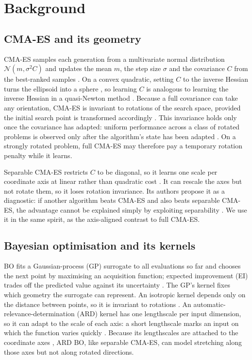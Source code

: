 \documentclass[12pt]{article}
\begin{document}
\section{Background}
\label{sec:background}
\subsection{CMA-ES and its geometry}
CMA-ES samples each generation from a multivariate normal distribution $\mathcal N(m,\sigma^2 C)$ and updates the mean $m$, the step size $\sigma$ and the covariance $C$ from the best-ranked samples \parencite[p.~8]{hansen2023tutorial}. On a convex quadratic, setting $C$ to the inverse Hessian turns the ellipsoid into a sphere \parencite[p.~7]{hansen2023tutorial}, so learning $C$ is analogous to learning the inverse Hessian in a quasi-Newton method \parencite[p.~22]{hansen2023tutorial}. Because a full covariance can take any orientation, CMA-ES is invariant to rotations of the search space, provided the initial search point is transformed accordingly \parencite[p.~24]{hansen2023tutorial}. This invariance holds only once the covariance has adapted: uniform performance across a class of rotated problems is observed only after the algorithm's state has been adapted \parencite[p.~24]{hansen2023tutorial}. On a strongly rotated problem, full CMA-ES may therefore pay a temporary rotation penalty while it learns.

Separable CMA-ES restricts $C$ to be diagonal, so it learns one scale per coordinate axis at linear rather than quadratic cost \parencite{ros2008simple}. It can rescale the axes but not rotate them, so it loses rotation invariance. Its authors propose it as a diagnostic: if another algorithm beats CMA-ES and also beats separable CMA-ES, the advantage cannot be explained simply by exploiting separability \parencite{ros2008simple}. We use it in the same spirit, as the axis-aligned contrast to full CMA-ES.

\subsection{Bayesian optimisation and its kernels}
BO fits a Gaussian-process (GP) surrogate to all evaluations so far and chooses the next point by maximising an acquisition function; expected improvement (EI) trades off the predicted value against its uncertainty \parencite{jones1998ego,frazier2018tutorial}. The GP's kernel fixes which geometry the surrogate can represent. An isotropic kernel depends only on the distance between points, so it is invariant to rotations \parencite{rasmussen2006gpml}. An automatic-relevance-determination (ARD) kernel has one lengthscale per input dimension, so it can adapt to the scale of each axis: a short lengthscale marks an input on which the function varies quickly \parencite[p.~106]{rasmussen2006gpml}. Because its lengthscales are attached to the coordinate axes \parencite[p.~106]{rasmussen2006gpml}, ARD BO, like separable CMA-ES, can model stretching along those axes but not along rotated directions.
\end{document}
